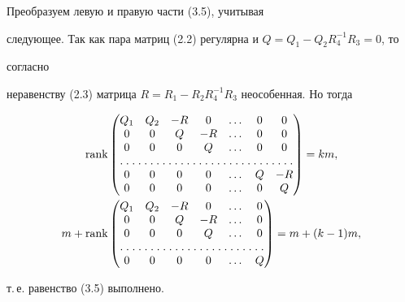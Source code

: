 \begin{pf} 


Преобразуем левую и правую части (3.5), учитывая 


следующее. Так как пара матриц (2.2) регулярна и $Q=Q_1-Q_2R^{-1}_4R_3=0$, то 


согласно 


неравенству (2.3) матрица $R=R_1-R_2R^{-1}_4R_3$ неособенная. Но тогда 


\begin{align*} 


\rank & 


\begin{pmatrix} 


Q_1 & Q_2 & -R & 0 & \dotsc & 0 & 0 \\ 


0 & 0 & Q & -R & \dotsc & 0 & 0 \\ 


0 & 0 & 0 & Q & \dotsc & 0 & 0 \\ 


\hdotsfor[1.5]{7} \\


0 & 0 & 0 & 0 & \dotsc & Q & -R \\ 


0 & 0 & 0 & 0 & \dotsc & 0 & Q 


\end{pmatrix} 


=km,\\ m+\rank & 


\begin{pmatrix} 


Q_1 & Q_2 & -R & 0 & \dotsc & 0 \\ 


0 & 0 & Q & -R & \dotsc & 0 \\ 


0 & 0 & 0 & Q & \dotsc & 0 \\ 


\hdotsfor[1.5]{6} \\


0 & 0 & 0 & 0 & \dotsc & Q 


\end{pmatrix} 


=m+(k-1)m, 


\end{align*} 


т.\,е. равенство (3.5) выполнено. 


\end{pf} 


